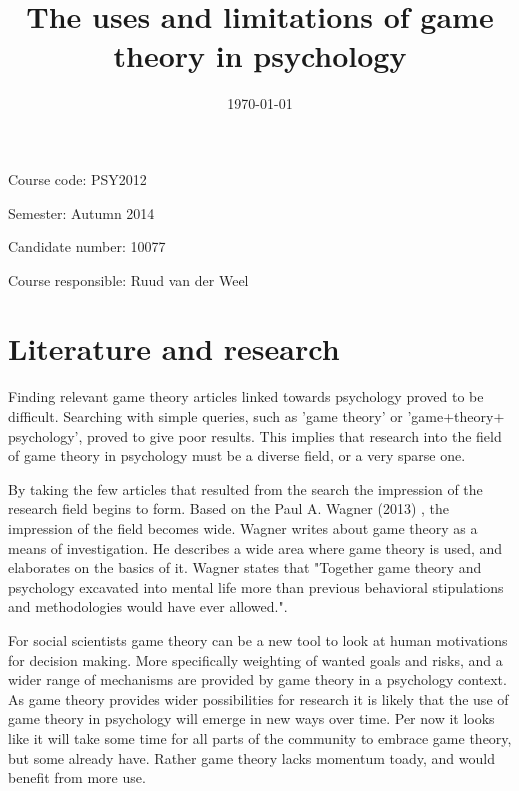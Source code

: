 \documentclass[12pt, a4paper]{article}
\title{
	The uses and limitations of game theory in psychology
}
\author{
}
\date{\today}
\begin{document}
\onehalfspace
\maketitle
{}

Course code: PSY2012

Semester: Autumn 2014

Candidate number: 10077

Course responsible: Ruud van der Weel

\tableofcontents
\newpage 

\section{Literature and research}

Finding relevant game theory articles linked towards psychology proved to be
difficult. Searching with simple queries, such as 'game theory' or
'game+theory+ psychology', proved to give poor results. This implies that
research into the field of game theory in psychology must be a diverse field,
or a very sparse one.

By taking the few articles that resulted from the search the impression of the
research field begins to form. Based on the Paul A. Wagner (2013)
\cite{psyinvest}, the impression of the field becomes wide. Wagner writes about
game theory as a means of investigation. He describes a wide area where game
theory is used, and elaborates on the basics of it. Wagner states that
"Together game theory and psychology excavated into mental life more than
previous behavioral stipulations and methodologies would have ever
allowed."\cite{psyinvest}. 


For social scientists game theory can be a new tool to look at human
motivations for decision making. More specifically weighting of wanted goals
and risks, and a wider range of mechanisms are provided by game theory in a
psychology context. As game theory provides wider possibilities for research it
is likely that the use of game theory in psychology will emerge in new ways
over time. Per now it looks like it will take some time for all parts of
the community to embrace game theory, but some already have. Rather game theory
lacks momentum toady, and would benefit from more use.   
\end{document}
